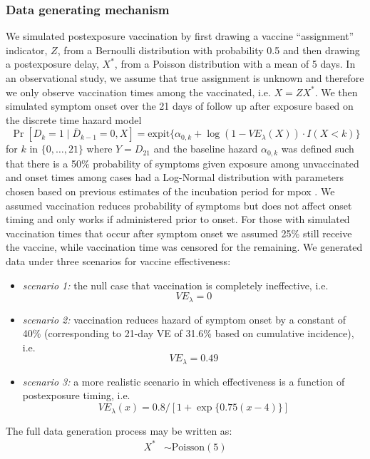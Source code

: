 \begin{appendices}
\begin{refsection}
    \subsubsection{Data generating mechanism}
    We simulated postexposure vaccination by first drawing a vaccine ``assignment'' indicator, $Z$, from a Bernoulli distribution with probability 0.5 and then drawing a postexposure delay, $X^*$, from a Poisson distribution with a mean of 5 days. In an observational study, we assume that true assignment is unknown and therefore we only observe vaccination times among the vaccinated, i.e. $X = ZX^* $. We then simulated symptom onset over the 21 days of follow up after exposure based on the discrete time hazard model 
    $$\Pr[D_k = 1 \mid \overline{D}_{k-1} = 0, X] =  \text{expit}\{\alpha_{0,k} + \log(1 - VE_{\lambda}(X)) \cdot I(X < k)\}$$
    for $k$ in $\{0, \ldots, 21\}$ where $Y = D_{21}$ and the baseline hazard $\alpha_{0,k}$ was defined such that there is a 50\% probability of symptoms given exposure among unvaccinated and onset times among cases had a Log-Normal distribution with parameters chosen based on previous estimates of the incubation period for mpox \cite{miura_estimated_2022}. We assumed vaccination reduces probability of symptoms but does not affect onset timing and only works if administered prior to onset. For those with simulated vaccination times that occur after symptom onset we assumed 25\% still receive the vaccine, while vaccination time was censored for the remaining. We generated data under three scenarios for vaccine effectiveness: 
    \begin{itemize}
        \item \textit{scenario 1:} the null case that vaccination is completely ineffective, i.e.
        $$VE_{\lambda} = 0$$
        \item \textit{scenario 2:} vaccination reduces hazard of symptom onset by a constant of 40\% (corresponding to 21-day VE of 31.6\% based on cumulative incidence), i.e. 
        $$VE_{\lambda} = 0.49$$
        \item \textit{scenario 3:} a more realistic scenario in which effectiveness is a function of postexposure timing, i.e.
        $$VE_{\lambda}(x) = 0.8/[1+\exp\{0.75(x-4)\}]$$
    \end{itemize}
    The full data generation process may be written as:
    \begin{align*}
        X^* & \sim \text{Poisson}(5) \\

\end{align*}
\end{refsection}
\end{appendices}
